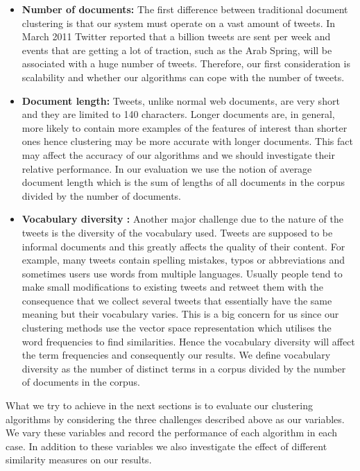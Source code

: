 \begin{itemize}
   \item \textbf{Number of documents:} The first difference between traditional document clustering is that our system must operate on a vast amount 
   of tweets. In March 2011 Twitter reported that a billion tweets are sent per week \citep{TwitterBlog} and events that are getting a lot 
   of traction, such as the Arab Spring, will be associated with a huge number of tweets. Therefore, our first consideration is scalability and whether our algorithms can cope with the 
   number of tweets.    
   \item \textbf{Document length:} Tweets, unlike normal web documents, are very short and they are limited to 140 characters. Longer documents are, in general, more likely
  to contain more examples of the features of interest than shorter ones \citep{doi:10.1080/09296174.2011.533588} hence clustering may be more accurate with longer documents. This fact may 
  affect the accuracy of our algorithms and we should investigate their relative performance. In our evaluation we use the notion of average document length which is the sum of lengths of all documents 
  in the corpus divided by the number of documents. 
   \item \textbf{Vocabulary diversity :} Another major challenge due to the nature of the tweets is the diversity of the vocabulary used. Tweets are supposed to be informal documents
   and this greatly affects the quality of their content. For example, many tweets contain spelling mistakes, typos or abbreviations and sometimes users use words from multiple languages.
   Usually people tend to make small modifications to existing tweets and retweet them with the consequence that we collect several tweets that essentially have the same meaning but their
   vocabulary varies. This is a big concern for us since our clustering methods use the vector space representation which utilises the word frequencies to find similarities. Hence the vocabulary 
   diversity will affect the term frequencies and consequently our results. We define vocabulary diversity as the number of distinct terms in a corpus divided by the number of documents in the corpus.
\end{itemize} 
What we try to achieve in the next sections is to evaluate our clustering algorithms by considering the three challenges described above as our variables. We vary these variables and 
record the performance of each algorithm in each case. In addition to these variables we also investigate the effect of different similarity measures on our results. 


